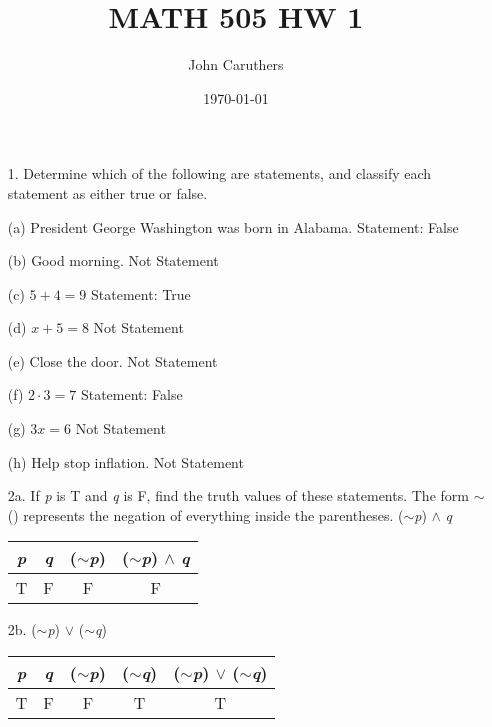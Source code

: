 \documentclass{article}
\title{MATH 505 HW 1}
\author{John Caruthers}
\date\today
\begin{document}
\maketitle

\begin{itemize}
    \item [1.] Determine which of the following are statements, and classify each statement as either true or false.
    
    (a) President George Washington was born in Alabama. {\color{blue} Statement: False}
    
    (b) Good morning. {\color{red} Not Statement}
    
    (c) \(5 + 4 = 9\) {\color{blue} Statement: True}
    
    (d) \(x + 5 = 8\) {\color{red} Not Statement}
    
    (e) Close the door. {\color{red} Not Statement}
    
    (f) \(2 \cdot 3 = 7\) {\color{blue} Statement: False}
    
    (g) \(3x = 6\) {\color{red} Not Statement}
    
    (h) Help stop inflation. {\color{red} Not Statement}
    
    \item[2a.] If \emph{p} is T and \emph{q} is F, find the truth values of these statements.  The form $\sim$() represents the negation of everything inside the parentheses.  ($\sim$\emph{p}) $\wedge$ \emph{q}
    \begin{center}
        \begin{tabular}{|c|c|c|c|}
             \hline
             \emph{p} & \emph{q} & ($\sim$\emph{p}) & ($\sim$\emph{p}) $\wedge$ \emph{q} \\
             \hline
              T & F & F & F\\
              \hline
        \end{tabular}
    \end{center}
    
    \item[2b.] ($\sim$\emph{p}) $\vee$ ($\sim$\emph{q})
    \begin{center}
        \begin{tabular}{|c|c|c|c|c|}
            \hline
            \emph{p} & \emph{q} & ($\sim$\emph{p}) & ($\sim$\emph{q}) &  ($\sim$\emph{p}) $\vee$ ($\sim$\emph{q})\\
            \hline
            T & F & F & T & T\\
            \hline
        \end{tabular}
    \end{center}
    

\end{itemize}
\end{document}
